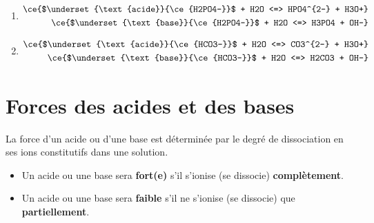 \documentclass[
  11pt,
  a4paper,
  openany]{book}
\providecommand{\tightlist}{%
  \setlength{\itemsep}{0pt}\setlength{\parskip}{0pt}}
\begin{document}
\begin{Answer}

\begin{enumerate}
\def\labelenumi{\alph{enumi}.}
\tightlist
\item
  \[
  \begin{split}
    \ce{$\underset{\text{acide}}{\ce{H2PO4-}}$ + H2O <=> HPO4^{2-} + H3O+} \\
    \ce{$\underset{\text{base}}{\ce{H2PO4-}}$ + H2O <=> H3PO4 + OH-} \\
  \end{split}
  \]
\item
  \[
  \begin{split}
    \ce{$\underset{\text{acide}}{\ce{HCO3-}}$ + H2O <=> CO3^{2-} + H3O+} \\
    \ce{$\underset{\text{base}}{\ce{HCO3-}}$ + H2O <=> H2CO3 + OH-} \\
  \end{split}
  \]
\end{enumerate}

\end{Answer}

\clearpage

\section{Forces des acides et des bases}\label{forces-des-acides-et-des-bases}

La force d'un acide ou d'une base est déterminée par le degré de dissociation en ses ions constitutifs dans une solution.

\begin{itemize}
\tightlist
\item
  Un acide ou une base sera \textbf{fort(e)} s'il s'ionise (se dissocie) \textbf{complètement}.
\item
  Un acide ou une base sera \textbf{faible} s'il ne s'ionise (se dissocie) que \textbf{partiellement}.
\end{itemize}
\end{document}
